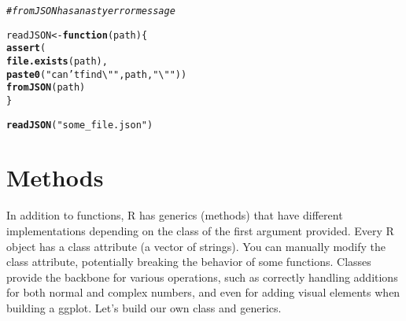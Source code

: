 \documentclass[twoside,twocolumn]{article}\usepackage[]{graphicx}\usepackage[dvipsnames]{xcolor}
\makeatletter
\newcommand{\hlstr}[1]{\textcolor[rgb]{0.192,0.494,0.8}{#1}}%
\newcommand{\hlcom}[1]{\textcolor[rgb]{0.678,0.584,0.686}{\textit{#1}}}%
\newcommand{\hlstd}[1]{\textcolor[rgb]{0.345,0.345,0.345}{#1}}%
\newcommand{\hlkwa}[1]{\textcolor[rgb]{0.161,0.373,0.58}{\textbf{#1}}}%
\newcommand{\hlkwb}[1]{\textcolor[rgb]{0.69,0.353,0.396}{#1}}%
\newcommand{\hlkwc}[1]{\textcolor[rgb]{0.333,0.667,0.333}{#1}}%
\newcommand{\hlkwd}[1]{\textcolor[rgb]{0.737,0.353,0.396}{\textbf{#1}}}%
\newenvironment{kframe}{%
 \def\at@end@of@kframe{}%
 \ifinner\ifhmode%
  \def\at@end@of@kframe{\end{minipage}}%
  \begin{minipage}{\columnwidth}%
 \fi\fi%
 \def\FrameCommand##1{\hskip\@totalleftmargin \hskip-\fboxsep
 \colorbox{shadecolor}{##1}\hskip-\fboxsep
     \hskip-\linewidth \hskip-\@totalleftmargin \hskip\columnwidth}%
 \MakeFramed {\advance\hsize-\width
   \@totalleftmargin\z@ \linewidth\hsize
   \@setminipage}}%
 {\par\unskip\endMakeFramed%
 \at@end@of@kframe}
\newenvironment{knitrout}{}{} %
\makeatother
\begin{document}
\begin{knitrout}
\color{fgcolor}\begin{kframe}
\begin{alltt}
\hlcom{# fromJSON has a nasty error message}

\hlstd{readJSON} \hlkwb{<-} \hlkwa{function}\hlstd{(}\hlkwc{path}\hlstd{) \{}
  \hlkwd{assert}\hlstd{(}
    \hlkwd{file.exists}\hlstd{(path),}
    \hlkwd{paste0}\hlstd{(}\hlstr{"can't find \textbackslash{}""}\hlstd{, path,}\hlstr{"\textbackslash{}""}\hlstd{))}
  \hlkwd{fromJSON}\hlstd{(path)}
\hlstd{\}}

\hlkwd{readJSON}\hlstd{(}\hlstr{"some_file.json"}\hlstd{)}
\end{alltt}


{\ttfamily\noindent\bfseries{}}\end{kframe}
\end{knitrout}

\section*{Methods}
In addition to functions, R has generics (methods) that have different implementations depending on the class of the first argument provided. Every R object has a class attribute (a vector of strings). You can manually modify the class attribute, potentially breaking the behavior of some functions. Classes provide the backbone for various operations, such as correctly handling additions for both normal and complex numbers, and even for adding visual elements when building a ggplot. Let's build our own class and generics.
\end{document}
